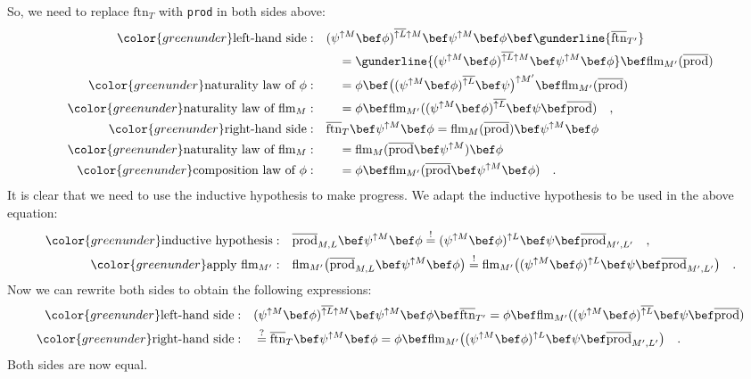 So, we need to replace $\text{ftn}_{T}$ with \lstinline!prod! in
both sides above:
\begin{align*}
{\color{greenunder}\text{left-hand side}:}\quad & (\psi^{\uparrow M}\bef\phi)^{\overline{\uparrow L}\uparrow M}\bef\psi^{\uparrow M}\bef\phi\bef\gunderline{\overline{\text{ftn}}_{T^{\prime}}}\\
 & \quad=\gunderline{(\psi^{\uparrow M}\bef\phi)^{\overline{\uparrow L}\uparrow M}\bef\psi^{\uparrow M}\bef\phi}\bef\text{flm}_{M^{\prime}}(\overline{\text{prod}})\\
{\color{greenunder}\text{naturality law of }\phi:}\quad & \quad=\phi\bef\big((\psi^{\uparrow M}\bef\phi)^{\overline{\uparrow L}}\bef\psi\big)^{\uparrow M^{\prime}}\bef\text{flm}_{M^{\prime}}(\overline{\text{prod}})\\
{\color{greenunder}\text{naturality law of }\text{flm}_{M}:}\quad & \quad=\phi\bef\text{flm}_{M^{\prime}}((\psi^{\uparrow M}\bef\phi)^{\overline{\uparrow L}}\bef\psi\bef\overline{\text{prod}})\quad,\\
{\color{greenunder}\text{right-hand side}:}\quad & \overline{\text{ftn}}_{T}\bef\psi^{\uparrow M}\bef\phi=\text{flm}_{M}(\overline{\text{prod}})\bef\psi^{\uparrow M}\bef\phi\\
{\color{greenunder}\text{naturality law of }\text{flm}_{M}:}\quad & \quad=\text{flm}_{M}(\overline{\text{prod}}\bef\psi^{\uparrow M})\bef\phi\\
{\color{greenunder}\text{composition law of }\phi:}\quad & \quad=\phi\bef\text{flm}_{M^{\prime}}(\overline{\text{prod}}\bef\psi^{\uparrow M}\bef\phi)\quad.
\end{align*}
It is clear that we need to use the inductive hypothesis to make progress.
We adapt the inductive hypothesis to be used in the above equation:
\begin{align*}
{\color{greenunder}\text{inductive hypothesis}:}\quad & \overline{\text{prod}}_{M,L}\bef\psi^{\uparrow M}\bef\phi\overset{!}{=}(\psi^{\uparrow M}\bef\phi)^{\uparrow L}\bef\psi\bef\overline{\text{prod}}_{M^{\prime},L^{\prime}}\quad,\\
{\color{greenunder}\text{apply }\text{flm}_{M^{\prime}}:}\quad & \text{flm}_{M^{\prime}}\big(\overline{\text{prod}}_{M,L}\bef\psi^{\uparrow M}\bef\phi\big)\overset{!}{=}\text{flm}_{M^{\prime}}\big((\psi^{\uparrow M}\bef\phi)^{\uparrow L}\bef\psi\bef\overline{\text{prod}}_{M^{\prime},L^{\prime}}\big)\quad.
\end{align*}
Now we can rewrite both sides to obtain the following expressions:
\begin{align*}
{\color{greenunder}\text{left-hand side}:}\quad & (\psi^{\uparrow M}\bef\phi)^{\overline{\uparrow L}\uparrow M}\bef\psi^{\uparrow M}\bef\phi\bef\overline{\text{ftn}}_{T^{\prime}}=\phi\bef\text{flm}_{M^{\prime}}((\psi^{\uparrow M}\bef\phi)^{\overline{\uparrow L}}\bef\psi\bef\overline{\text{prod}})\\
{\color{greenunder}\text{right-hand side}:}\quad & \overset{?}{=}\overline{\text{ftn}}_{T}\bef\psi^{\uparrow M}\bef\phi=\phi\bef\text{flm}_{M^{\prime}}\big((\psi^{\uparrow M}\bef\phi)^{\uparrow L}\bef\psi\bef\overline{\text{prod}}_{M^{\prime},L^{\prime}}\big)\quad.
\end{align*}
Both sides are now equal.

